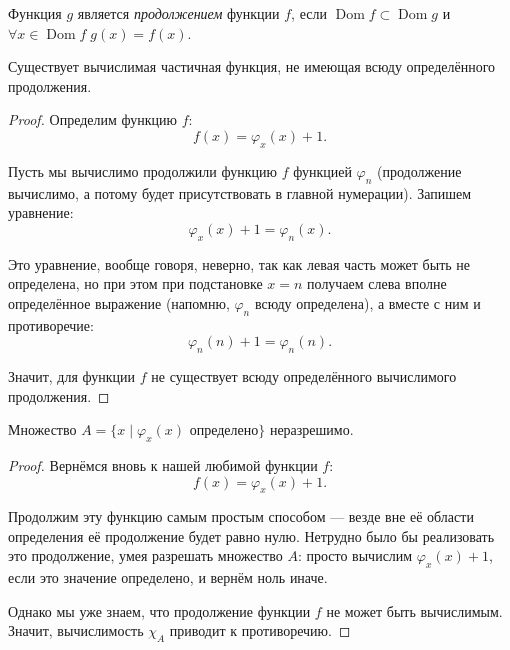 \documentclass{article}
\begin{document}
    \begin{definition}
        Функция \(g\) является \textit{продолжением} функции \(f\), если \(\operatorname{Dom} f \subset
        \operatorname{Dom} g\) и \(\forall x \in \operatorname{Dom} f \; g(x) = f(x)\).
    \end{definition}

    \begin{theorem}
        Существует вычислимая частичная функция, не имеющая всюду определённого продолжения.
    \end{theorem}
    \begin{proof}
        Определим функцию \(f\):
        \[
            f(x) = \varphi_x(x) + 1.
        \]

        Пусть мы вычислимо продолжили функцию \(f\) функцией \(\varphi_n\) (продолжение вычислимо, а потому
        будет присутствовать в главной нумерации). Запишем уравнение:
        \[
            \varphi_x(x) + 1 = \varphi_n(x).
        \]

        Это уравнение, вообще говоря, неверно, так как левая часть может быть не определена, но при
        этом при подстановке \(x = n\) получаем слева вполне определённое выражение (напомню,
        \(\varphi_n\) всюду определена), а вместе с ним и противоречие:
        \[
            \varphi_n(n) + 1 = \varphi_n(n).
        \]

        Значит, для функции \(f\) не существует всюду определённого вычислимого продолжения.
    \end{proof}

    \begin{theorem}
        Множество \(A = \{x \mid \varphi_x(x) \text{ определено}\}\) неразрешимо.
    \end{theorem}
    \begin{proof}
        Вернёмся вновь к нашей любимой функции \(f\):
        \[
            f(x) = \varphi_x(x) + 1.
        \]

        Продолжим эту функцию самым простым способом --- везде вне её области определения её
        продолжение будет равно нулю. Нетрудно было бы реализовать это продолжение, умея разрешать
        множество \(A\): просто вычислим \(\varphi_x(x) + 1\), если это значение определено, и вернём ноль
        иначе.

        Однако мы уже знаем, что продолжение функции \(f\) не может быть вычислимым. Значит,
        вычислимость \(\chi_A\) приводит к противоречию.
    \end{proof}
\end{document}
